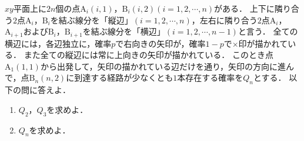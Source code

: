 \documentclass[../../main.tex]{subfiles}
\begin{document}
$xy$平面上に$2n$個の点$\mathrm{A}_i(i,1)$，$\mathrm{B}_i(i,2) (i=1,2,\cdots,n)$がある．
上下に隣り合う$2$点$\mathrm{A}_i$，$\mathrm{B}_i$を結ぶ線分を「縦辺」$(i=1,2,\cdots,n)$，左右に隣り合う$2$点$\mathrm{A}_i$，$\mathrm{A}_{i+1}$および$\mathrm{B}_i$，$\mathrm{B}_{i+1}$を結ぶ線分を「横辺」$(i=1,2,\cdots,n-1)$と言う．
全ての横辺には，各辺独立に，確率$p$で右向きの矢印が，確率$1-p$で$\times$印が描かれている．
また全ての縦辺には常に上向きの矢印が描かれている．
このとき点$\mathrm{A}_1(1,1)$から出発して，矢印の描かれている辺だけを通り，矢印の方向に進んで，点$\mathrm{B}_{n}(n,2)$に到達する経路が少なくとも$1$本存在する確率を$Q_n$とする．
以下の問に答えよ．
\begin{enumerate}
  \item $Q_2$，$Q_3$を求めよ．
  \item $Q_n$を求めよ．
\end{enumerate}
\end{document}
